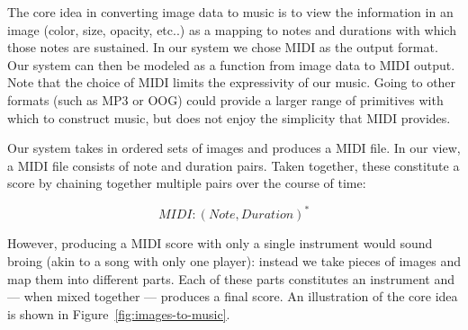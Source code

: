 \documentclass[10pt, conference, compsocconf]{IEEEtran}
\begin{document}
The core idea in converting image data to music is to view the
information in an image (color, size, opacity, etc..) as a mapping to
notes and durations with which those notes are sustained.  In our
system we chose MIDI as the output format.  Our system can then be
modeled as a function from image data to MIDI output.  Note that the
choice of MIDI limits the expressivity of our music.  Going to other
formats (such as MP3 or OOG) could provide a larger range of
primitives with which to construct music, but does not enjoy the
simplicity that MIDI provides.

Our system takes in ordered sets of images and produces a MIDI file.
In our view, a MIDI file consists of note and duration pairs.  Taken
together, these constitute a score by chaining together multiple pairs
over the course of time:

\[
MIDI : (Note,Duration)^{\ast}
\]

However, producing a MIDI score with only a single instrument would
sound broing (akin to a song with only one player): instead we take
pieces of images and map them into different parts.  Each of these
parts constitutes an instrument and --- when mixed together ---
produces a final score.  An illustration of the core idea is shown in
Figure~\ref{fig:images-to-music}.
\end{document}
